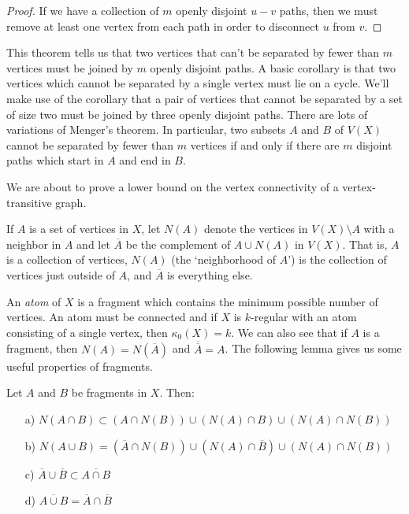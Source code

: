 \begin{proof}
If we have a collection of $m$ openly disjoint $u{-}v$ paths, then we must remove at least one vertex from each path in order to disconnect $u$ from $v$.
\end{proof}

This theorem tells us that two vertices that can't be separated by fewer than $m$ vertices must be joined by $m$ openly disjoint paths.  A basic corollary is that two vertices which cannot be separated by a single vertex must lie on a cycle.  We'll make use of the corollary that a pair of vertices that cannot be separated by a set of size two must be joined by three openly disjoint paths.  There are lots of variations of Menger's theorem.  In particular, two subsets $A$ and $B$ of $V(X)$ cannot be separated by fewer than $m$ vertices if and only if there are $m$ disjoint paths which start in $A$ and end in $B$.

We are about to prove a lower bound on the vertex connectivity of a vertex-transitive graph.

If $A$ is a set of vertices in $X$, let $N(A)$ denote the vertices in $V(X)\setminus A$ with a neighbor in $A$ and let $\overline{A}$ be the complement of $A\cup N(A)$ in $V(X)$.  That is, $A$ is a collection of vertices, $N(A)$ (the `neighborhood of $A$') is the collection of vertices just outside of $A$, and $\overline{A}$ is everything else.


An \textit{atom} of $X$ is a fragment which contains the minimum possible number of vertices.  An atom must be connected and if $X$ is $k$-regular with an atom consisting of a single vertex, then $\kappa_0(X)=k$.  We can also see that if $A$ is a fragment, then $N(A)=N(\overline{A})$ and $\overline{\overline{A}}=A$.  The following lemma gives us some useful properties of fragments.

\begin{lemma}
Let $A$ and $B$ be fragments in $X$.  Then:
\begin{enumerate}
\item[a)] $N(A\cap B)\subset (A\cap N(B))\cup (N(A)\cap B) \cup (N(A)\cap N(B))$
\item[b)] $N(A\cup B) = (\overline{A}\cap N(B))\cup (N(A) \cap \overline{B}) \cup (N(A)\cap N(B))$
\item[c)] $\overline{A}\cup\overline{B} \subset \overline{A\cap B}$
\item[d)] $\overline{A\cup B}=\overline{A}\cap\overline{B}$
\end{enumerate}
\end{lemma}

